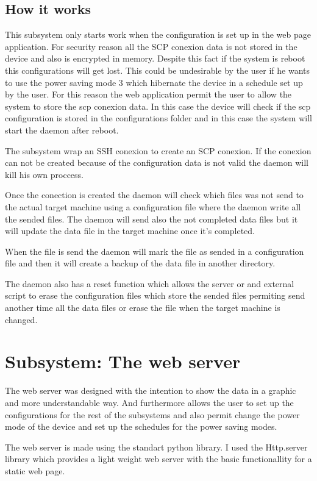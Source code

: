 		\subsection{How it works}
		This subsystem only starts work when the configuration is set up in the web page application. For security reason all the SCP conexion data is not stored in the device and also is encrypted in memory. Despite this fact if the system is reboot this configurations will get lost. This could be undesirable by the user if he wants to use the power saving mode 3 which hibernate the device in a schedule set up by the user. For this reason the web application permit the user to allow the system to store the scp conexion data. In this case the device will check if the scp configuration is stored in the configurations folder and in this case the system will start the daemon after reboot.

		The subsystem wrap an SSH conexion to create an SCP conexion. If the conexion can not be created because of the configuration data is not valid the daemon will kill his own proccess.

		Once the conection is created the daemon will check which files was not send to the actual target machine using a configuration file where the daemon write all the sended files. The daemon will send also the not completed data files but it will update the data file in the target machine once it's completed.

		When the file is send the daemon will mark the file as sended in a configuration file and then it will create a backup of the data file in another directory.

		The daemon also has a reset function which allows the server or and external script to erase the configuration files which store the sended files permiting send another time all the data files or erase the file when the target machine is changed.

	\section{Subsystem: The web server}
	The web server was designed with the intention to show the data in a graphic and more understandable way. And furthermore allows the user to set up the configurations for the rest of the subsystems and also permit change the power mode of the device and set up the schedules for the power saving modes.

	The web server is made using the standart python library. I used the Http.server library which provides a light weight web server with the basic functionallity for a static web page.

